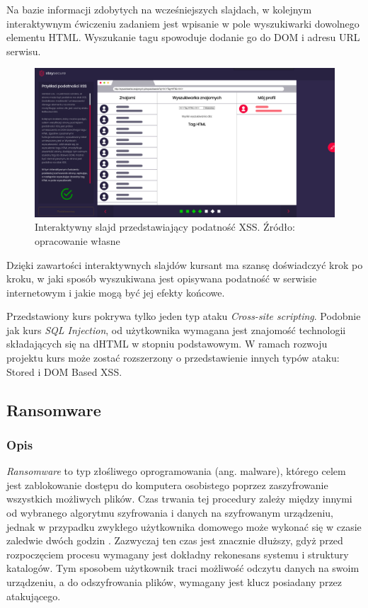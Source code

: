 \documentclass[12pt,twoside]{article}
\begin{document}
Na bazie informacji zdobytych na wcześniejszych slajdach, w kolejnym interaktywnym ćwiczeniu zadaniem jest wpisanie w pole wyszukiwarki dowolnego elementu HTML. Wyszukanie tagu spowoduje dodanie go do DOM i adresu URL serwisu.

\begin{figure}[H]
	\centering
	\includegraphics[width=1\linewidth]{figures/xss-slide-screenshot2}
	\caption{Interaktywny slajd przedstawiający podatność XSS. Źródło: opracowanie własne}
\end{figure}

Dzięki zawartości interaktywnych slajdów kursant ma szansę doświadczyć krok po kroku, w jaki sposób wyszukiwana jest opisywana podatność w serwisie internetowym i jakie mogą być jej efekty końcowe. 

Przedstawiony kurs pokrywa tylko jeden typ ataku \emph{Cross-site scripting}. Podobnie jak kurs \emph{SQL Injection}, od użytkownika wymagana jest znajomość technologii składających się na dHTML w stopniu podstawowym. W ramach rozwoju projektu kurs może zostać rozszerzony o przedstawienie innych typów ataku: Stored i DOM Based XSS.


\clearpage

\subsection{Ransomware}
\subsubsection{Opis}
\emph{Ransomware} to typ złośliwego oprogramowania (ang. malware), którego celem jest zablokowanie dostępu do komputera osobistego poprzez zaszyfrowanie wszystkich możliwych plików. Czas trwania tej procedury zależy między innymi od wybranego algorytmu szyfrowania i danych na szyfrowanym urządzeniu, jednak w przypadku zwykłego użytkownika domowego może wykonać się w czasie zaledwie dwóch godzin \cite{RansomwareTime}. Zazwyczaj ten czas jest znacznie dłuższy, gdyż przed rozpoczęciem procesu wymagany jest dokładny rekonesans systemu i struktury katalogów. Tym sposobem użytkownik traci możliwość odczytu danych na swoim urządzeniu, a do odszyfrowania plików, wymagany jest klucz posiadany przez atakującego. 
\end{document}
